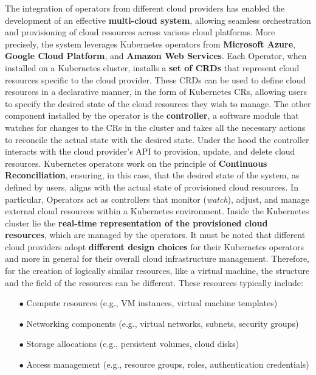 The integration of operators from different cloud providers has enabled the development of an effective \textbf{multi-cloud system}, allowing seamless orchestration and provisioning of cloud resources across various cloud platforms. 
More precisely, the system leverages Kubernetes operators from \textbf{Microsoft Azure}, \textbf{Google Cloud Platform}, and \textbf{Amazon Web Services}.
Each Operator, when installed on a Kubernetes cluster, installs a \textbf{set of CRDs} that represent cloud resources specific to the cloud provider.
These CRDs can be used to define cloud resources in a declarative manner, in the form of Kubernetes CRs, allowing users to specify the desired state of the cloud resources they wish to manage.
The other component installed by the operator is the \textbf{controller}, a software module that watches for changes to the CRs in the cluster and takes all the necessary actions to reconcile the actual state with the desired state.
Under the hood the controller interacts with the cloud provider's API to provision, update, and delete cloud resources.
Kubernetes operators work on the principle of \textbf{Continuous Reconciliation}, ensuring, in this case, that the desired state of the system, as defined by users, aligns with the actual state of provisioned cloud resources. 
In particular, Operators act as controllers that monitor (\textit{watch}), adjust, and manage external cloud resources within a Kubernetes environment. 
Inside the Kubernetes cluster lie the \textbf{real-time representation of the provisioned cloud resources}, which are managed by the operators.
It must be noted that different cloud providers adopt \textbf{different design choices} for their Kubernetes operators and more in general for their overall cloud infrastructure management. 
Therefore, for the creation of logically similar resources, like a virtual machine, the structure and the field of the resources can be different. 
These resources typically include:
\begin{itemize}[itemsep=0.2pt, topsep=1pt]
  \item[$\bullet$] Compute resources (e.g., VM instances, virtual machine templates)
  \item[$\bullet$] Networking components (e.g., virtual networks, subnets, security groups)
  \item[$\bullet$] Storage allocations (e.g., persistent volumes, cloud disks)
  \item[$\bullet$] Access management (e.g., resource groups, roles, authentication credentials) \\
\end{itemize}

